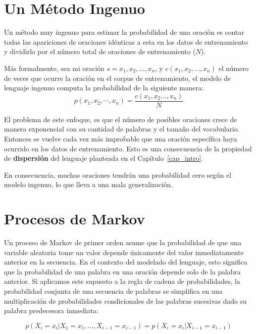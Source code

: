 \section{Un Método Ingenuo}
Un método muy ingenuo para estimar la probabilidad de una oración es contar todas las apariciones de  oraciones idénticas a esta en los datos de entrenamiento y dividirlo por el número total de oraciones de entrenamiento ($N$).

Más formalmente, sea mi oración $s=x_1, x_2, \ldots, x_n$, y $c(x_1, x_2, \ldots, x_n)$  el número de veces que ocurre la oración en el corpus de entrenamiento, el modelo de lenguaje ingenuo computa la probabilidad de la siguiente manera: \begin{displaymath}
p(x_1,x_2,\cdots,x_n)=\frac{c(x_1,x_2 \dots,x_n)}{N}
\end{displaymath}

El problema de este enfoque, es que el número de posibles oraciones crece de manera exponencial con su cantidad de palabras y el tamaño del vocabulario. Entonces se vuelve cada vez más improbable que una oración específica haya ocurrido en los datos de entrenamiento. Esto es una consecuencia de la propiedad de \textbf{dispersión} del lenguaje planteada en el Capítulo~\ref{cap_intro}.

En consecuencia, muchas oraciones tendrán una probabilidad cero según el modelo ingenuo, lo que lleva a una mala generalización.

\section{Procesos de Markov}


Un proceso de Markov de primer orden asume que la probabilidad de que una variable aleatoria tome un valor depende únicamente del valor inmediatamente anterior en la secuencia. En el contexto del modelado del lenguaje, esto significa que la probabilidad de una palabra en una oración depende solo de la palabra anterior. Si aplicamos este supuesto a la regla de cadena de probabilidades, la probabilidad conjunta de una secuencia de palabras se simplifica en una multiplicación de probabilidades condicionales de las palabras sucesivas dado su palabra predecesora inmediata:

\begin{equation}
p(X_i = x_i|X_1 = x_1, \ldots, X_{i-1} = x_{i-1}) = p(X_i = x_i|X_{i-1} = x_{i-1})
\end{equation}




